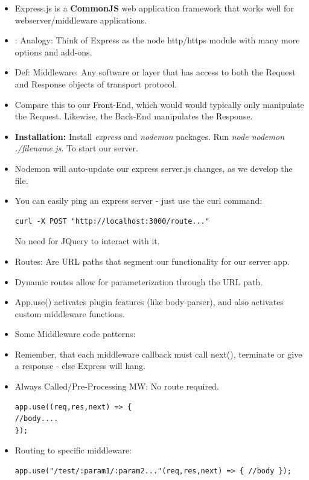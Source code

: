 \documentclass[8pt,a4paper]{extarticle}
\begin{document}
\begin{itemize}
\item Express.js is a \textbf{CommonJS} web application framework that works well for webserver/middleware applications.
\item: Analogy: Think of Express as the node http/https module with many more options and add-ons.
\item Def: Middleware: Any software or layer that has access to both the Request and Response objects of transport protocol.
\item Compare this to our Front-End, which would would typically only manipulate the Request. Likewise, the Back-End manipulates the Response.
\item \textbf{Installation:} Install \textit{express} and \textit{nodemon} packages. Run \textit{node nodemon ./filename.js}. To start our server.
\item Nodemon will auto-update our express server.js changes, as we develop the file.
\item You can easily ping an express server - just use the curl command:

\begin{verbatim}
curl -X POST "http://localhost:3000/route..."
\end{verbatim}

No need for JQuery to interact with it.

\item Routes: Are URL paths that segment our functionality for our server app. 
\item Dynamic routes allow for parameterization through the URL path.
\item App.use() activates plugin features (like body-parser), and also activates custom middleware functions.
\item Some Middleware code patterns: 
\item Remember, that each middleware callback must call next(), terminate or give a response - else Express will hang.

\item Always Called/Pre-Processing MW: No route required.

\begin{verbatim}
app.use((req,res,next) => {
//body....
});
\end{verbatim}


\item Routing to specific middleware:

\begin{verbatim}
app.use("/test/:param1/:param2..."(req,res,next) => { //body });
\end{verbatim}


\end{itemize}
\end{document}
